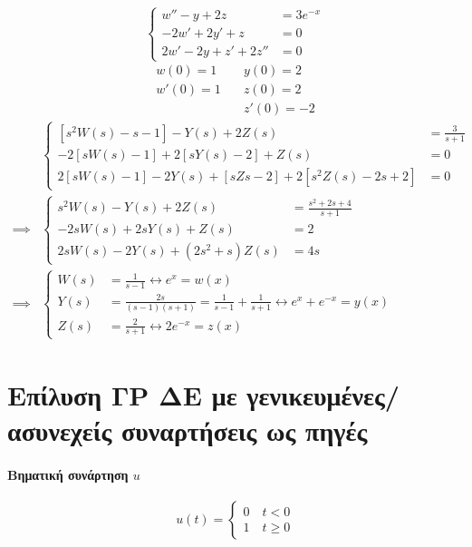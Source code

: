 \documentclass[11pt,a4paper,titlepage,final]{article}
\begin{document}
\begin{exercise*}{12.17}
	\[
	\begin{cases}
	w''-y+2z &= 3e^{-x} \\
	-2w'+2y'+z &= 0 \\
	2w'-2y+z'+2z'' &= 0 
	\end{cases}
	\]
	\begin{align*}
	w(0)=1 \quad & y(0) = 2 \\
	w'(0)=1 \quad & z(0) = 2 \\
	& z'(0) = -2
	\end{align*}
	\tcblower
	\begin{align*}
	& \begin{cases}
	\left[s^2W(s)-s-1\right]-Y(s)+2Z(s) &= \frac{3}{s+1} \\
	-2\left[sW(s)-1\right]+2\left[sY(s)-2\right]+Z(s) &= 0 \\
	2\left[sW(s)-1\right]-2Y(s) + \left[sZs-2\right]+2\left[s^2Z(s)-2s+2\right] &= 0
	\end{cases} \\ \implies &
	\begin{cases}
	s^2W(s) - Y(s)+2Z(s) &= \frac{s^2+2s+4}{s+1} \\
	-2sW(s)+2sY(s)+Z(s) &= 2 \\
	2sW(s)-2Y(s)+(2s^2+s)Z(s) &= 4s
	\end{cases} \\ \implies &
	\begin{cases}
	W(s) &= \frac{1}{s-1} \leftrightarrow e^x =w(x) \\
	Y(s) &= \frac{2s}{(s-1)(s+1)} = \frac{1}{s-1}+\frac{1}{s+1} \leftrightarrow e^x+e^{-x}=y(x) \\
	Z(s) &= \frac{2}{s+1} \leftrightarrow 2e^{-x}=z(x)
	\end{cases}
	\end{align*}
\end{exercise*}

\section{Επίλυση ΓΡ ΔΕ με γενικευμένες/ασυνεχείς συναρτήσεις ως πηγές}
\paragraph{Βηματική συνάρτηση \( u \)}
\[
u(t)= \begin{cases}
0 \quad t<0 \\
1 \quad t \geq0
\end{cases}
\]
\end{document}
